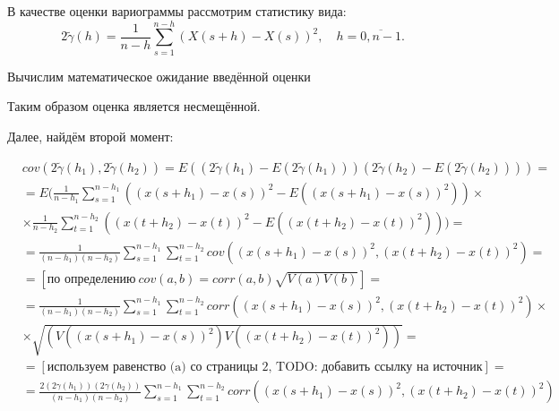 \documentclass[a4paper]{article}
\begin{document}
В качестве оценки вариограммы рассмотрим статистику вида:
\begin{equation}
	2 \tilde{\gamma}(h) = \frac{1}{n-h} \sum_{s=1}^{n-h}(X(s+h) - X(s))^2, \quad h = \overline{0, n-1}.
\end{equation}

Вычислим математическое ожидание введённой оценки %

Таким образом оценка является несмещённой.

Далее, найдём второй момент:


\begin{eqnarray}
	& cov(2 \tilde{\gamma}(h_1), 2 \tilde{\gamma}(h_2)) = E((2 \tilde{\gamma}(h_1) - E(2 \tilde{\gamma}(h_1))) (2 \tilde{\gamma}(h_2) - E(2 \tilde{\gamma}(h_2)))) = \\
	& = E(\frac{1}{n-h_1} \sum_{s=1}^{n-h_1}((x(s+h_1) - x(s))^2 - E((x(s+h_1) - x(s))^2)) \times \\
	& \times \frac{1}{n-h_2} \sum_{t=1}^{n-h_2}((x(t+h_2) - x(t))^2 - E((x(t+h_2) - x(t))^2))) = \\
	& = \frac{1}{(n-h_1)(n-h_2)}\sum_{s=1}^{n-h_1}\sum_{t=1}^{n-h_2} cov((x(s+h_1) - x(s))^2, (x(t+h_2) - x(t))^2) = \\
	& = [\text{по определению} ~ cov(a,b) = corr(a,b)\sqrt{V(a)V(b)}] = \\
	& = \frac{1}{(n-h_1)(n-h_2)}\sum_{s=1}^{n-h_1}\sum_{t=1}^{n-h_2} corr((x(s+h_1) - x(s))^2, (x(t+h_2) - x(t))^2) \times \\
	& \times \sqrt{(V((x(s+h_1) - x(s))^2) V((x(t+h_2) - x(t))^2))} = \\
	& = [\text{используем равенство (a) со страницы 2, TODO: добавить ссылку на источник}] = \\
	& = \frac{2 (2\gamma(h_1))(2\gamma(h_2))}{(n-h_1)(n-h_2)}\sum_{s=1}^{n-h_1}\sum_{t=1}^{n-h_2} corr((x(s+h_1) - x(s))^2, (x(t+h_2) - x(t))^2)
\end{eqnarray}
\end{document}
